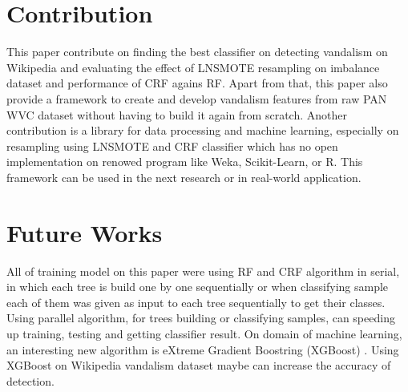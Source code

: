 \section{Contribution}

This paper contribute on finding the best classifier on detecting vandalism on
Wikipedia and evaluating the effect of LNSMOTE resampling on imbalance dataset
and performance of CRF agains RF.
Apart from that, this paper also provide a framework to create and develop
vandalism features from raw PAN WVC dataset without having to build it again
from scratch.
Another contribution is a library for data processing and machine learning,
especially on resampling using LNSMOTE and CRF classifier which has no
open implementation on renowed program like Weka, Scikit-Learn, or R.
This framework can be used in the next research or in real-world application.

\section{Future Works}

All of training model on this paper were using RF and CRF algorithm in serial,
in which each tree is build one by one sequentially or when classifying sample
each of them was given as input to each tree sequentially to get their classes.
Using parallel algorithm, for trees building or classifying samples, can
speeding up training, testing and getting classifier result.
On domain of machine learning, an interesting new algorithm is eXtreme
Gradient Boostring (XGBoost)
\cite{chen2016xgboost}.
Using XGBoost on Wikipedia vandalism dataset maybe can increase the accuracy
of detection.





